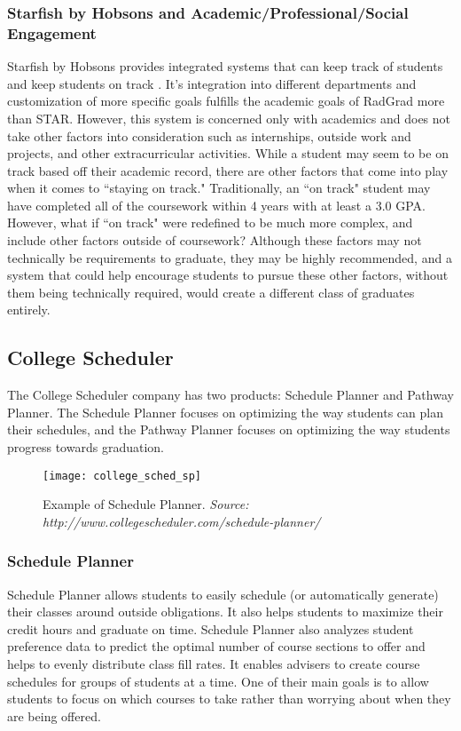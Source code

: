 \subsubsection{Starfish by Hobsons and Academic/Professional/Social Engagement}
Starfish by Hobsons provides integrated systems that can keep track of students and keep students on track \cite{Starfish}. It's integration into different departments and customization of more specific goals fulfills the academic goals of RadGrad more than STAR. However, this system is concerned only with academics and does not take other factors into consideration such as internships, outside work and projects, and other extracurricular activities. While a student may seem to be on track based off their academic record, there are other factors that come into play when it comes to ``staying on track." Traditionally, an ``on track" student may have completed all of the coursework within 4 years with at least a 3.0 GPA. However, what if ``on track" were redefined to be much more complex, and include other factors outside of coursework? Although these factors may not technically be requirements to graduate, they may be highly recommended, and a system that could help encourage students to pursue these other factors, without them being technically required, would create a different class of graduates entirely. 

\subsection{College Scheduler}
The College Scheduler company has two products: Schedule Planner and Pathway Planner. \cite{CollegeScheduler} The Schedule Planner focuses on optimizing the way students can plan their schedules, and the Pathway Planner focuses on optimizing the way students progress towards graduation.

\begin{figure}[h]
\centering
\texttt{[image: college\_sched\_sp]}
\caption{Example of Schedule Planner. \textit{Source: http://www.collegescheduler.com/schedule-planner/}}
\end{figure}


\subsubsection{Schedule Planner}
Schedule Planner allows students to easily schedule (or automatically generate) their classes around outside obligations. It also helps students to maximize their credit hours and graduate on time. Schedule Planner also analyzes student preference data to predict the optimal number of course sections to offer and helps to evenly distribute class fill rates. It enables advisers to create course schedules for groups of students at a time. One of their main goals is to allow students to focus on which courses to take rather than worrying about when they are being offered.

